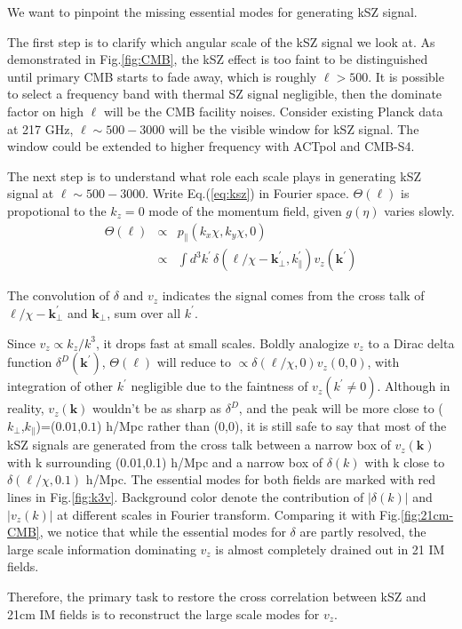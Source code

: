 We want to pinpoint the missing essential modes for generating kSZ signal. 

The first step is to clarify which angular scale of the kSZ signal 
we look at. 
As demonstrated in Fig.\ref{fig:CMB}, 
the kSZ effect is too faint to 
be distinguished until 
primary CMB starts to fade away, 
which is roughly $\ell>500$. 
It is possible to select a frequency band with thermal SZ signal negligible, 
then the dominate factor on high $\ell$ will be the CMB facility noises. 
Consider existing Planck \cite{Planck2015} data at 217 GHz, 
$\ell \sim 500-3000$ will be the visible window for kSZ signal. 
The window could be extended to higher frequency with 
ACTpol and CMB-S4. 


The next step is to understand what role each scale plays in generating kSZ signal 
at $\ell \sim 500-3000$. 
Write Eq.(\ref{eq:ksz}) in Fourier space. 
$\Theta(\bm{\ell})$ is propotional to the $k_z=0$ mode of the momentum field, 
given $g(\eta)$ varies slowly. 
\begin{eqnarray}
    \label{eq:thetak}
    \Theta(\bm{\ell})&\propto&p_\parallel({k}_x\chi,{k}_y\chi,0)\\
    &\propto&\int 
    d^3k^\prime\,\delta(\bm{\ell}/\chi-\bm{k}_\perp^\prime,k_\parallel^\prime) v_z(\bm{k^\prime})\nonumber
    \end{eqnarray}

The convolution of $\delta$ and $v_z$ 
indicates the signal comes from the cross talk of 
$\bm{\ell}/\chi-\bm{k}_\perp^\prime$ and $\bm{k}_\perp$, 
sum over all $k^\prime$. 

Since $v_z \propto k_z/k^3$, 
it drops fast at small scales. 
Boldly analogize $v_z$ to a Dirac delta function $\delta^D(\bm{k}^\prime)$, 
$\Theta(\bm{\ell})$ will reduce to $\propto\delta(\bm{\ell}/\chi,0) v_z(0,0)$, 
with integration of other $k^\prime$ negligible due to the faintness of 
$v_z(k^\prime\neq0)$. 
Although in reality, $v_z(\bm{k})$ 
wouldn't be as sharp as $\delta^D$, 
and the peak will be more close to 
($k_\perp$,$k_\parallel$)=($0.01$,$0.1$) h/Mpc 
rather than (0,0),
it is still safe to say 
that most of the kSZ signals are 
generated from the cross talk between a narrow box of 
$v_z(\bm{k})$ with k  
surrounding (0.01,0.1) h/Mpc 
and a narrow box of $\delta(k)$ with k close to 
$\delta(\bm{\ell}/\chi,0.1)$ h/Mpc. 
The essential modes for both fields are marked with 
red lines in Fig.\ref{fig:k3v}. 
Background color denote the contribution of $|\delta(k)|$ and $|v_z(k)|$ 
at different scales in Fourier transform. 
Comparing it with Fig.\ref{fig:21cm-CMB}, 
we notice that while the 
essential modes for $\delta$ are partly resolved, 
the large scale information dominating $v_z$ is 
almost completely drained out in 21 IM fields.

Therefore, the primary task to restore the cross correlation 
between kSZ and 21cm IM fields is to reconstruct the 
large scale modes for $v_z$.
